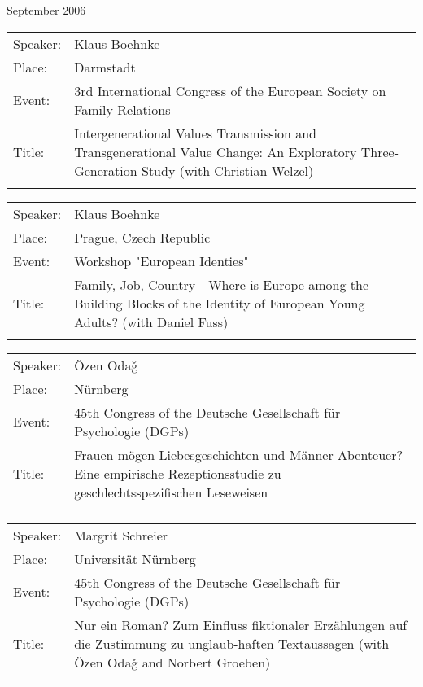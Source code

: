 {\begin{flushleft}
September 2006\\[0.5cm] 
\end{flushleft}
\begin{tabular}{lp{13.4cm}}
 Speaker:	&  Klaus Boehnke \\
 Place: 	 &Darmstadt\\
 Event:   &	3rd International Congress of the European Society on Family Relations\\
 Title: &	Intergenerational Values Transmission and Transgenerational Value Change: An Exploratory Three-Generation Study (with Christian Welzel)\\ \\
\end{tabular}
\begin{tabular}{lp{13.4cm}}
 Speaker:	&  Klaus Boehnke \\
 Place: 	 &Prague, Czech Republic\\
 Event:   &	Workshop "European Identies"\\
 Title: &	Family, Job, Country - Where is Europe among the Building Blocks of the Identity of European Young Adults? (with Daniel Fuss)\\ \\
\end{tabular}
\begin{tabular}{lp{13.4cm}}
 Speaker:	&  \"{O}zen Oda\v{g}\\
 Place: 	 &N\"{u}rnberg\\
 Event:   &	45th Congress of the Deutsche Gesellschaft f\"{u}r Psychologie (DGPs)\\
 Title: &	Frauen m\"{o}gen Liebesgeschichten und M\"{a}nner Abenteuer? Eine empirische Rezeptionsstudie zu geschlechtsspezifischen Leseweisen\\ \\
\end{tabular}
\begin{tabular}{lp{13.4cm}}
 Speaker:	&  Margrit Schreier\\
 Place: 	 &Universit\"{a}t N\"{u}rnberg\\
 Event:   &	45th Congress of the Deutsche Gesellschaft f\"{u}r Psychologie (DGPs)\\
 Title: &	Nur ein Roman? Zum Einfluss fiktionaler Erz\"{a}hlungen auf die Zustimmung zu unglaub-haften Textaussagen (with \"{O}zen Oda\v{g} and Norbert Groeben)\\ \\
\end{tabular}
}

